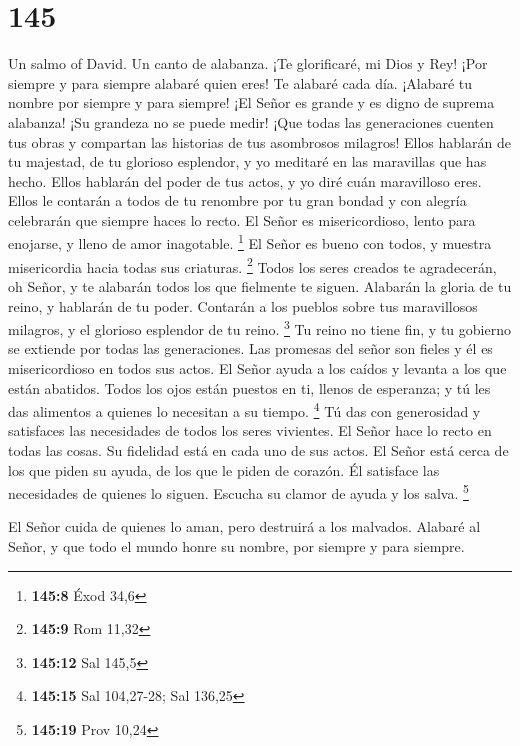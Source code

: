 \hypertarget{section-144}{%
\section{145}\label{section-144}}

Un salmo of David. Un canto de alabanza.  ¡Te glorificaré,
mi Dios y Rey! ¡Por siempre y para siempre alabaré quien eres!
 Te alabaré cada día. ¡Alabaré tu nombre por siempre y para
siempre!  ¡El Señor es grande y es digno de suprema
alabanza! ¡Su grandeza no se puede medir!  ¡Que todas las
generaciones cuenten tus obras y compartan las historias de tus
asombrosos milagros!  Ellos hablarán de tu majestad, de tu
glorioso esplendor, y yo meditaré en las maravillas que has hecho.
 Ellos hablarán del poder de tus actos, y yo diré cuán
maravilloso eres.  Ellos le contarán a todos de tu renombre
por tu gran bondad y con alegría celebrarán que siempre haces lo recto.
 El Señor es misericordioso, lento para enojarse, y lleno de
amor inagotable. \footnote{\textbf{145:8} Éxod 34,6}  El
Señor es bueno con todos, y muestra misericordia hacia todas sus
criaturas. \footnote{\textbf{145:9} Rom 11,32}  Todos los
seres creados te agradecerán, oh Señor, y te alabarán todos los que
fielmente te siguen.  Alabarán la gloria de tu reino, y
hablarán de tu poder.  Contarán a los pueblos sobre tus
maravillosos milagros, y el glorioso esplendor de tu reino. \footnote{\textbf{145:12}
  Sal 145,5}  Tu reino no tiene fin, y tu gobierno se
extiende por todas las generaciones. Las promesas del señor son fieles y
él es misericordioso en todos sus actos.  El Señor ayuda a
los caídos y levanta a los que están abatidos.  Todos los
ojos están puestos en ti, llenos de esperanza; y tú les das alimentos a
quienes lo necesitan a su tiempo. \footnote{\textbf{145:15} Sal
  104,27-28; Sal 136,25}  Tú das con generosidad y
satisfaces las necesidades de todos los seres vivientes. 
El Señor hace lo recto en todas las cosas. Su fidelidad está en cada uno
de sus actos.  El Señor está cerca de los que piden su
ayuda, de los que le piden de corazón.  Él satisface las
necesidades de quienes lo siguen. Escucha su clamor de ayuda y los
salva. \footnote{\textbf{145:19} Prov 10,24}

 El Señor cuida de quienes lo aman, pero destruirá a los
malvados.  Alabaré al Señor, y que todo el mundo honre su
nombre, por siempre y para siempre.

